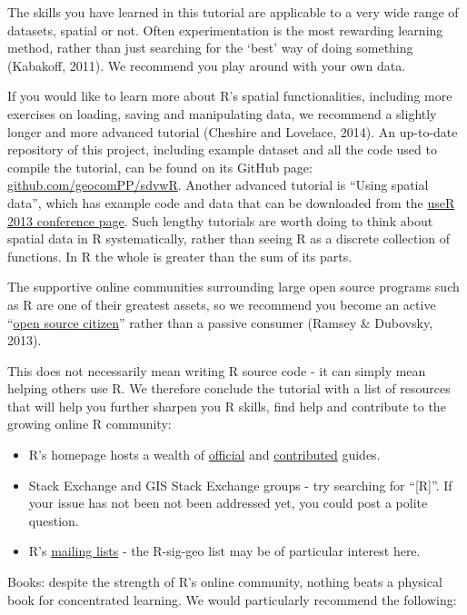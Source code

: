 \documentclass[]{article}
\begin{document}
The skills you have learned in this tutorial are applicable to a very
wide range of datasets, spatial or not. Often experimentation is the
most rewarding learning method, rather than just searching for the
`best' way of doing something (Kabakoff, 2011). We recommend you play
around with your own data.

If you would like to learn more about R's spatial functionalities,
including more exercises on loading, saving and manipulating data, we
recommend a slightly longer and more advanced tutorial (Cheshire and
Lovelace, 2014). An up-to-date repository of this project, including
example dataset and all the code used to compile the tutorial, can be
found on its GitHub page:
\href{https://github.com/geocomPP/sdvwR}{github.com/geocomPP/sdvwR}.
Another advanced tutorial is ``Using spatial data'', which has example
code and data that can be downloaded from the
\href{http://www.edii.uclm.es/~useR-2013//Tutorials/Bivand.html}{useR
2013 conference page}. Such lengthy tutorials are worth doing to think
about spatial data in R systematically, rather than seeing R as a
discrete collection of functions. In R the whole is greater than the sum
of its parts.

The supportive online communities surrounding large open source programs
such as R are one of their greatest assets, so we recommend you become
an active
``\href{http://blog.cleverelephant.ca/2013/10/being-open-source-citizen.html}{open
source citizen}'' rather than a passive consumer (Ramsey \& Dubovsky,
2013).

This does not necessarily mean writing R source code - it can simply
mean helping others use R. We therefore conclude the tutorial with a
list of resources that will help you further sharpen you R skills, find
help and contribute to the growing online R community:

\begin{itemize}
\item
  R's homepage hosts a wealth of
  \href{http://cran.r-project.org/manuals.html}{official} and
  \href{http://cran.r-project.org/other-docs.html}{contributed} guides.
\item
  Stack Exchange and GIS Stack Exchange groups - try searching for
  ``{[}R{]}''. If your issue has not been not been addressed yet, you
  could post a polite question.
\item
  R's \href{http://www.r-project.org/mail.html}{mailing lists} - the
  R-sig-geo list may be of particular interest here.
\end{itemize}
Books: despite the strength of R's online community, nothing beats a
physical book for concentrated learning. We would particularly recommend
the following:
\end{document}
